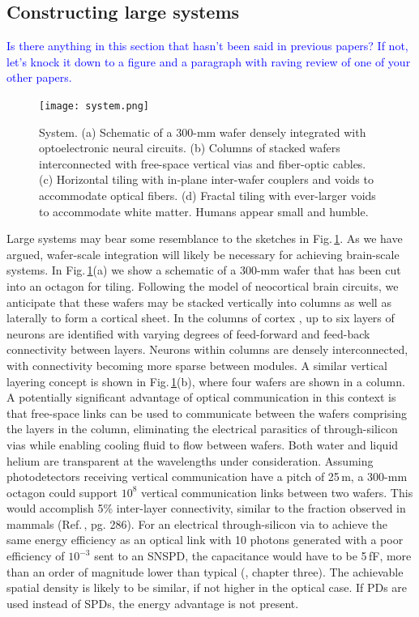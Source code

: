\documentclass[twocolumn]{article}
\begin{document}
\subsection{Constructing large systems}
\label{sec:constructing_large_systems}
\textcolor{blue}{Is there anything in this section that hasn't been said in previous papers? If not, let's knock it down to a figure and a paragraph with raving review of one of your other papers.}
\begin{figure}[t!]
    \centering
    \texttt{[image: system.png]}
    \caption{System. (a) Schematic of a 300-mm wafer densely integrated with optoelectronic neural circuits. (b) Columns of stacked wafers interconnected with free-space vertical vias and fiber-optic cables. (c) Horizontal tiling with in-plane inter-wafer couplers and voids to accommodate optical fibers. (d) Fractal tiling with ever-larger voids to accommodate white matter. Humans appear small and humble.}
    \label{fig:system}
\end{figure}
Large systems may bear some resemblance to the sketches in Fig.\,\ref{fig:system}. As we have argued, wafer-scale integration will likely be necessary for achieving brain-scale systems. In Fig.\,\ref{fig:system}(a) we show a schematic of a 300-mm wafer that has been cut into an octagon for tiling. Following the model of neocortical brain circuits, we anticipate that these wafers may be stacked vertically into columns as well as laterally to form a cortical sheet. In the columns of cortex \cite{mo1978,mo1997}, up to six layers of neurons are identified with varying degrees of feed-forward and feed-back connectivity between layers. Neurons within columns are densely interconnected, with connectivity becoming more sparse between modules. A similar vertical layering concept is shown in Fig.\,\ref{fig:system}(b), where four wafers are shown in a column. A potentially significant advantage of optical communication in this context is that free-space links can be used to communicate between the wafers comprising the layers in the column, eliminating the electrical parasitics of through-silicon vias while enabling cooling fluid to flow between wafers. Both water and liquid helium are transparent at the wavelengths under consideration. Assuming photodetectors receiving vertical communication have a pitch of 25\,\textmu m, a 300-mm octagon could support $10^8$ vertical communication links between two wafers. This would accomplish 5\% inter-layer connectivity, similar to the fraction observed in mammals (Ref.\,, pg. 286). For an electrical through-silicon via to achieve the same energy efficiency as an optical link with 10 photons generated with a poor efficiency of $10^{-3}$ sent to an SNSPD, the capacitance would have to be 5\,fF, more than an order of magnitude lower than typical (\cite{elfe2016}, chapter three). The achievable spatial density is likely to be similar, if not higher in the optical case. If PDs are used instead of SPDs, the energy advantage is not present.
\end{document}
